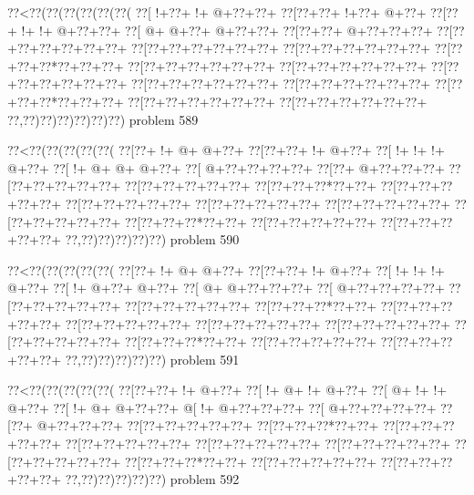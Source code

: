 \vbox{\vbox{\goo
\0??<\0??(\0??(\0??(\0??(\0??(\0??(
\0??[\- !+\0??+\- !+\- @+\0??+\0??+
\0??[\0??+\0??+\- !+\0??+\- @+\0??+
\0??[\0??+\- !+\- !+\- @+\0??+\0??+
\0??[\- @+\- @+\0??+\- @+\0??+\0??+
\0??[\0??+\0??+\- @+\0??+\0??+\0??+
\0??[\0??+\0??+\0??+\0??+\0??+\0??+
\0??[\0??+\0??+\0??+\0??+\0??+\0??+
\0??[\0??+\0??+\0??+\0??+\0??+\0??+
\0??[\0??+\0??+\0??*\0??+\0??+\0??+
\0??[\0??+\0??+\0??+\0??+\0??+\0??+
\0??[\0??+\0??+\0??+\0??+\0??+\0??+
\0??[\0??+\0??+\0??+\0??+\0??+\0??+
\0??[\0??+\0??+\0??+\0??+\0??+\0??+
\0??[\0??+\0??+\0??+\0??+\0??+\0??+
\0??[\0??+\0??+\0??*\0??+\0??+\0??+
\0??[\0??+\0??+\0??+\0??+\0??+\0??+
\0??[\0??+\0??+\0??+\0??+\0??+\0??+
\0??,\0??)\0??)\0??)\0??)\0??)\0??)
}
\hfil problem 589\hfil\break
}

\vbox{\vbox{\goo
\0??<\0??(\0??(\0??(\0??(\0??(
\0??[\0??+\- !+\- @+\- @+\0??+
\0??[\0??+\0??+\- !+\- @+\0??+
\0??[\- !+\- !+\- !+\- @+\0??+
\0??[\- !+\- @+\- @+\- @+\0??+
\0??[\- @+\0??+\0??+\0??+\0??+
\0??[\0??+\- @+\0??+\0??+\0??+
\0??[\0??+\0??+\0??+\0??+\0??+
\0??[\0??+\0??+\0??+\0??+\0??+
\0??[\0??+\0??+\0??*\0??+\0??+
\0??[\0??+\0??+\0??+\0??+\0??+
\0??[\0??+\0??+\0??+\0??+\0??+
\0??[\0??+\0??+\0??+\0??+\0??+
\0??[\0??+\0??+\0??+\0??+\0??+
\0??[\0??+\0??+\0??+\0??+\0??+
\0??[\0??+\0??+\0??*\0??+\0??+
\0??[\0??+\0??+\0??+\0??+\0??+
\0??[\0??+\0??+\0??+\0??+\0??+
\0??,\0??)\0??)\0??)\0??)\0??)
}
\hfil problem 590\hfil\break
}

\vbox{\vbox{\goo
\0??<\0??(\0??(\0??(\0??(\0??(
\0??[\0??+\- !+\- @+\- @+\0??+
\0??[\0??+\0??+\- !+\- @+\0??+
\0??[\- !+\- !+\- !+\- @+\0??+
\0??[\- !+\- @+\0??+\- @+\0??+
\0??[\- @+\- @+\0??+\0??+\0??+
\0??[\- @+\0??+\0??+\0??+\0??+
\0??[\0??+\0??+\0??+\0??+\0??+
\0??[\0??+\0??+\0??+\0??+\0??+
\0??[\0??+\0??+\0??*\0??+\0??+
\0??[\0??+\0??+\0??+\0??+\0??+
\0??[\0??+\0??+\0??+\0??+\0??+
\0??[\0??+\0??+\0??+\0??+\0??+
\0??[\0??+\0??+\0??+\0??+\0??+
\0??[\0??+\0??+\0??+\0??+\0??+
\0??[\0??+\0??+\0??*\0??+\0??+
\0??[\0??+\0??+\0??+\0??+\0??+
\0??[\0??+\0??+\0??+\0??+\0??+
\0??,\0??)\0??)\0??)\0??)\0??)
}
\hfil problem 591\hfil\break
}

\vbox{\vbox{\goo
\0??<\0??(\0??(\0??(\0??(\0??(
\0??[\0??+\0??+\- !+\- @+\0??+
\0??[\- !+\- @+\- !+\- @+\0??+
\0??[\- @+\- !+\- !+\- @+\0??+
\0??[\- !+\- @+\- @+\0??+\0??+
\- @[\- !+\- @+\0??+\0??+\0??+
\0??[\- @+\0??+\0??+\0??+\0??+
\0??[\0??+\- @+\0??+\0??+\0??+
\0??[\0??+\0??+\0??+\0??+\0??+
\0??[\0??+\0??+\0??*\0??+\0??+
\0??[\0??+\0??+\0??+\0??+\0??+
\0??[\0??+\0??+\0??+\0??+\0??+
\0??[\0??+\0??+\0??+\0??+\0??+
\0??[\0??+\0??+\0??+\0??+\0??+
\0??[\0??+\0??+\0??+\0??+\0??+
\0??[\0??+\0??+\0??*\0??+\0??+
\0??[\0??+\0??+\0??+\0??+\0??+
\0??[\0??+\0??+\0??+\0??+\0??+
\0??,\0??)\0??)\0??)\0??)\0??)
}
\hfil problem 592\hfil\break
}

